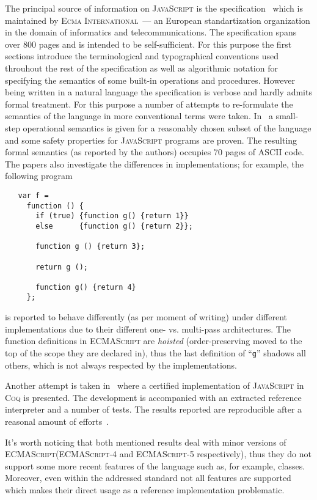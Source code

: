 \documentclass{article}
\newcommand{\js}{\textsc{JavaScript}\xspace}
\newcommand{\es}{\textsc{ECMAScript}\xspace}
\newcommand{\ecma}{\textsc{Ecma International}\xspace}
\begin{document}
The principal source of information on \js is the specification~\cite{Spec} which is maintained by
\ecma~--- an European standartization organization in the domain of informatics and telecommunications.
The specification spans over 800 pages and is intended to be self-sufficient. For this purpose
the first sections introduce the terminological and typographical conventions used throuhout the rest of
the specification as well as algorithmic notation for specifying the semantics of some built-in operations
and procedures. However being written in a natural language the specification is verbose and hardly admits
formal treatment. For this purpose a number of attempts to re-formulate the semantics of the language
in more conventional terms were taken. In~\cite{Operational1,Operational2} a small-step operational
semantics is given for a reasonably chosen subset of the language and some safety properties for
\js programs are proven. The resulting formal semantics (as reported by the authors) occupies 70 pages of
ASCII code. The papers also investigate the differences in implementations; for example, the following
program

\begin{lstlisting}
   var f =
     function () {
       if (true) {function g() {return 1}}
       else      {function g() {return 2}};
       
       function g () {return 3};
    
       return g ();
    
       function g() {return 4}
     };
\end{lstlisting}

is reported to behave differently (as per moment of writing) under different implementations due to their
different one- vs. multi-pass architectures. The function definitions in \es are \emph{hoisted} (order-preserving
moved to the top of the scope they are declared in), thus the last definition of ``\lstinline|g|'' shadows
all others, which is not always respected by the implementations.

Another attempt is taken in~\cite{Trusted,JSCert} where a certified implementation of \js in \textsc{Coq} is
presented. The development is accompanied with an extracted reference interpreter and a number of tests. The
results reported are reproducible after a reasonal amount of efforts~\cite{JSCert-lozov}.

It's worth noticing that both mentioned results deal with minor versions of \es (\es-4 and \es-5 respectively), thus
they do not support some more recent features of the language such as, for example, classes. Moreover, even
within the addressed standard not all features are supported which makes their direct usage as a reference
implementation problematic.
\end{document}
